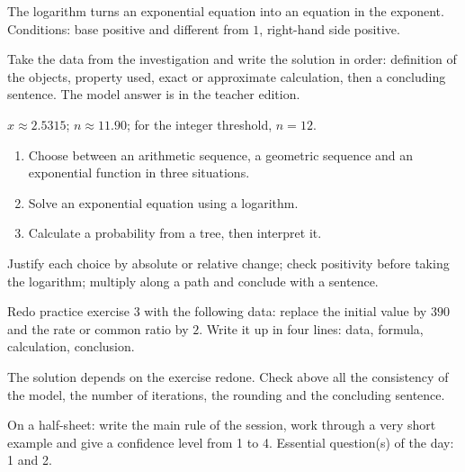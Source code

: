 \begin{summary}The logarithm turns an exponential equation into an equation in the exponent. Conditions: base positive and different from $1$, right-hand side positive.\end{summary}

\begin{example}
Take the data from the investigation and write the solution in order: definition of the objects, property used, exact or approximate calculation, then a concluding sentence. The model answer is in the teacher edition.
\end{example}
\begin{solution}$x\approx\num{2,5315}$; $n\approx\num{11,90}$; for the integer threshold, $n=12$.\end{solution}

\begin{exercise}[essential]
\begin{enumerate}\item Choose between an arithmetic sequence, a geometric sequence and an exponential function in three situations.\item Solve an exponential equation using a logarithm.\item Calculate a probability from a tree, then interpret it.\end{enumerate}
\end{exercise}
\begin{solution}Justify each choice by absolute or relative change; check positivity before taking the logarithm; multiply along a path and conclude with a sentence.\end{solution}


\begin{homework}Redo practice exercise 3 with the following data: replace the initial value by $390$ and the rate or common ratio by $2$. Write it up in four lines: data, formula, calculation, conclusion.\end{homework}
\begin{solution}The solution depends on the exercise redone. Check above all the consistency of the model, the number of iterations, the rounding and the concluding sentence.\end{solution}

\begin{exitticket}[3 minutes]On a half-sheet: write the main rule of the session, work through a very short example and give a confidence level from 1 to 4. Essential question(s) of the day: 1 and 2.\end{exitticket}

